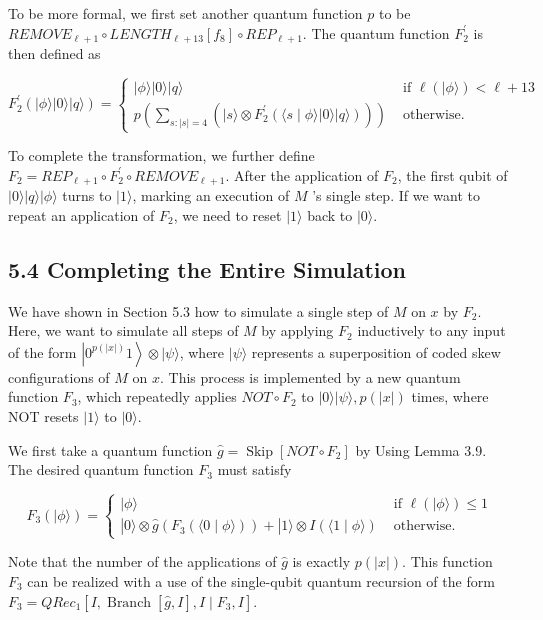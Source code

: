 \documentclass[10pt]{article}
\begin{document}
To be more formal, we first set another quantum function $p$ to be $R E M O V E_{\ell+1} \circ L E N G T H_{\ell+13}\left[f_{8}\right] \circ R E P_{\ell+1}$. The quantum function $F_{2}^{\prime}$ is then defined as

$$
F_{2}^{\prime}(|\phi\rangle|0\rangle|q\rangle)= \begin{cases}|\phi\rangle|0\rangle|q\rangle & \text { if } \ell(|\phi\rangle)<\ell+13 \\ p\left(\sum_{s:|s|=4}\left(|s\rangle \otimes F_{2}^{\prime}(\langle s \mid \phi\rangle|0\rangle|q\rangle)\right)\right) & \text { otherwise. }\end{cases}
$$

To complete the transformation, we further define $F_{2}=R E P_{\ell+1} \circ F_{2}^{\prime} \circ R E M O V E_{\ell+1}$. After the application of $F_{2}$, the first qubit of $|0\rangle|q\rangle|\phi\rangle$ turns to $|1\rangle$, marking an execution of $M$ 's single step. If we want to repeat an application of $F_{2}$, we need to reset $|1\rangle$ back to $|0\rangle$.

\subsection*{5.4 Completing the Entire Simulation}
We have shown in Section 5.3 how to simulate a single step of $M$ on $x$ by $F_{2}$. Here, we want to simulate all steps of $M$ by applying $F_{2}$ inductively to any input of the form $\left|0^{p(|x|)} 1\right\rangle \otimes|\psi\rangle$, where $|\psi\rangle$ represents a superposition of coded skew configurations of $M$ on $x$. This process is implemented by a new quantum function $F_{3}$, which repeatedly applies $N O T \circ F_{2}$ to $|0\rangle|\psi\rangle, p(|x|)$ times, where NOT resets $|1\rangle$ to $|0\rangle$.

We first take a quantum function $\hat{g}=\operatorname{Skip}\left[N O T \circ F_{2}\right]$ by Using Lemma 3.9. The desired quantum function $F_{3}$ must satisfy

$$
F_{3}(|\phi\rangle)= \begin{cases}|\phi\rangle & \text { if } \ell(|\phi\rangle) \leq 1 \\ |0\rangle \otimes \hat{g}\left(F_{3}(\langle 0 \mid \phi\rangle)\right)+|1\rangle \otimes I(\langle 1 \mid \phi\rangle) & \text { otherwise. }\end{cases}
$$

Note that the number of the applications of $\hat{g}$ is exactly $p(|x|)$. This function $F_{3}$ can be realized with a use of the single-qubit quantum recursion of the form $F_{3}=Q R e c_{1}\left[I, \operatorname{Branch}[\hat{g}, I], I \mid F_{3}, I\right]$.
\end{document}

